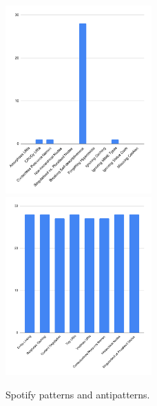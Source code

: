 \begin{figure}[htb!]

\includegraphics[width=0.5\textwidth]{img/barchart/spotifyBarAnti.pdf}
\includegraphics[width=0.5\textwidth]{img/barchart/spotifyBarPatt.pdf}
\caption{Spotify patterns and antipatterns.}
\label{fig:spotifyBarPatt}

\end{figure}

